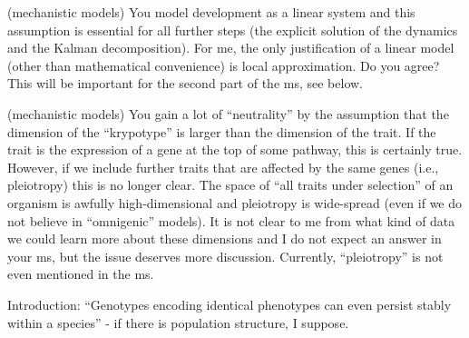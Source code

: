 
\begin{point}{(mechanistic models)}
    You model development as a linear system and this assumption is essential
   for all further steps (the explicit solution of the dynamics and the Kalman
decomposition). For me, the only justification of a linear model (other than
mathematical convenience) is local approximation. Do you agree? This will be
important for the second part of the ms, see below.
\end{point}


\begin{point}{(mechanistic models)}
    You gain a lot of ``neutrality'' by the assumption that the dimension of the
  ``krypotype'' is larger than the dimension of the trait. If the trait is the
expression of a gene at the top of some pathway, this is certainly true.
However, if we include further traits that are affected by the same genes
(i.e., pleiotropy) this is no longer clear. The space of ``all traits under
selection'' of an organism is awfully high-dimensional and pleiotropy is
wide-spread (even if we do not believe in ``omnigenic'' models). It is not clear
to me from what kind of data we could learn more about these dimensions and I
do not expect an answer in your ms, but the issue deserves more discussion.
Currently, ``pleiotropy'' is not even mentioned in the ms.   
\end{point}



\begin{point}{Introduction:}
    ``Genotypes encoding identical phenotypes can even persist stably within a species'' - if there is population structure, I suppose.
\end{point}



